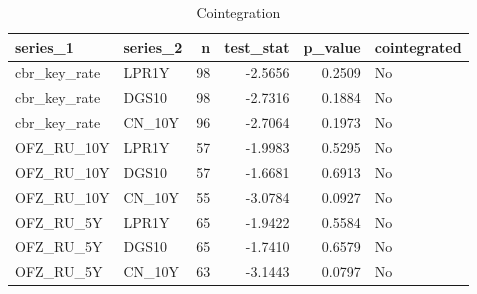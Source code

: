 \begin{table}
\caption{Cointegration}
\label{tab:5_3}
\begin{tabular}{llrrrl}
\toprule
series_1 & series_2 & n & test_stat & p_value & cointegrated \\
\midrule
cbr_key_rate & LPR1Y & 98 & -2.5656 & 0.2509 & No \\
cbr_key_rate & DGS10 & 98 & -2.7316 & 0.1884 & No \\
cbr_key_rate & CN_10Y & 96 & -2.7064 & 0.1973 & No \\
OFZ_RU_10Y & LPR1Y & 57 & -1.9983 & 0.5295 & No \\
OFZ_RU_10Y & DGS10 & 57 & -1.6681 & 0.6913 & No \\
OFZ_RU_10Y & CN_10Y & 55 & -3.0784 & 0.0927 & No \\
OFZ_RU_5Y & LPR1Y & 65 & -1.9422 & 0.5584 & No \\
OFZ_RU_5Y & DGS10 & 65 & -1.7410 & 0.6579 & No \\
OFZ_RU_5Y & CN_10Y & 63 & -3.1443 & 0.0797 & No \\
\bottomrule
\end{tabular}
\end{table}
